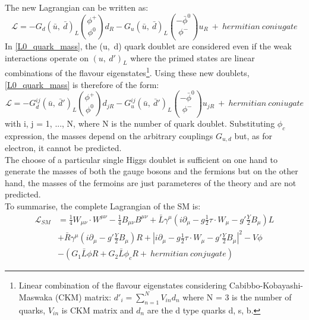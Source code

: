 The new Lagrangian can be written as:
\begin{equation}
\mathcal{L}= -G_{d}(\bar{u}, \ \bar{d})_{L}{\phi^{+} \choose \phi^{0}}d_{R}-G_{u}(\bar{u}, \ \bar{d})_{L}{-\bar{\phi}^{0} \choose \phi^{-}}u_{R}\ +\ hermitian\  coniugate
\label{L0_quark_mass}
\end{equation}
In \ref{L0_quark_mass}, the (u,\ d) quark doublet are considered even if the weak interactions operate on $(u,\  d')_{L}$ where the primed states are  linear combinations of the flavour eigenstates\footnote{Linear combination of the flavour eigenstates considering Cabibbo-Kobayashi-Maswaka (CKM) matrix: $d'_i = \sum_{n=1}^NV_{in}d_n  $ where N = 3 is the number of quarks, $V_{in}$ is CKM matrix and $d_{n}$ are the d type quarks d, s, b.}. Using these new doublets, \ref{L0_quark_mass} is therefore of the form:
\begin{equation}
\mathcal{L}= -G_{d}^{ij}(\bar{u}, \ \bar{d}')_{L}{\phi^{+} \choose \phi^{0}}d_{jR}-G_{u}^{ij}(\bar{u}, \ \bar{d}')_{L}{-\bar{\phi}^{0} \choose \phi^{-}}u_{jR}\ +\ hermitian\  coniugate
\label{L0_quark_mass_2}
\end{equation}
with i, j = 1, ..., N,  where N is the number of quark doublet. Substituting $\phi_{c}$ expression, the masses depend on the arbitrary couplings $G_{u,d}$ but, as for electron, it cannot be predicted.\\
The choose of a particular single Higgs doublet is sufficient on one hand to generate the masses of both the gauge bosons and the fermions but on the other hand, the masses of the fermoins are just parameteres of the theory and are not predicted. 
\\ To summarise, the complete Lagrangian of the SM is:
\begin{equation}
\begin{split}
\mathcal{L}_{SM} &= \frac{1}{4}W_{\mu\nu}\cdot W^{\mu\nu} - \frac{1}{4}B_{\mu\nu}B^{\mu\nu} + \bar{L}\gamma^{\mu}(i\partial_{\mu}-g\frac{1}{2}\tau \cdot W_{\mu} -g'\frac{Y}{2}B_{\mu})L \\
&+\bar{R}\gamma^{\mu}(i\partial_{\mu}-g'\frac{Y}{2}B_{\mu})R+|i\partial_{\mu}-g\frac{1}{2}\tau \cdot W_{\mu} -g'\frac{Y}{2}B_{\mu}|^{2} -V{\phi} \\
&-(G_{1}\bar{L}\phi R+G_{2}\bar{L} \phi_{c}R +\ hermitian\ conjugate)
\label{L0_SM}
\end{split}
\end{equation}
